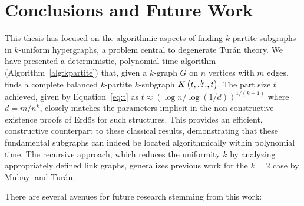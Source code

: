 \section{Conclusions and Future Work}\label{sec:conclusions} %

This thesis has focused on the algorithmic aspects of finding $k$-partite subgraphs in $k$-uniform hypergraphs, a problem central to degenerate Turán theory.
We have presented a deterministic, polynomial-time algorithm (Algorithm~\ref{alg:kpartite}) that, given a $k$-graph $G$ on $n$ vertices with $m$ edges, finds a complete balanced $k$-partite $k$-subgraph $K\left(t, \overset{k}{\dots}, t\right)$. The part size $t$ achieved, given by Equation~\eqref{eq:t} as $t \approx (\log n / \log(1/d))^{1/(k-1)}$ where $d=m/n^k$, closely matches the parameters implicit in the non-constructive existence proofs of Erd\H{o}s for such structures. This provides an efficient, constructive counterpart to these classical results, demonstrating that these fundamental subgraphs can indeed be located algorithmically within polynomial time. The recursive approach, which reduces the uniformity $k$ by analyzing appropriately defined link graphs, generalizes previous work for the $k=2$ case by Mubayi and Turán.

There are several avenues for future research stemming from this work:

